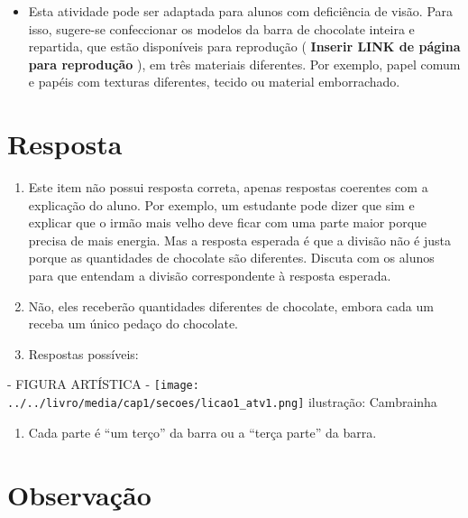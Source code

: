 \documentclass{book}
\begin{document}
\begin{itemize} %
    \item       Esta atividade pode ser adaptada para alunos com deficiência de visão. Para isso, sugere-se confeccionar os modelos da barra de chocolate  inteira e repartida, que estão disponíveis para reprodução (      {\bf Inserir LINK de página para reprodução}      ), em três materiais diferentes. Por exemplo, papel comum e papéis com texturas diferentes, tecido ou material emborrachado.
\end{itemize} %






\section{Resposta}
\begin{enumerate} [\quad a)] %
    \item       Este item não possui resposta correta, apenas respostas coerentes com a explicação do aluno. Por exemplo, um estudante pode dizer que sim e explicar que o irmão mais velho deve ficar com uma parte maior porque precisa de mais energia. Mas a resposta esperada é que a divisão não é justa porque as quantidades de chocolate são diferentes. Discuta com os alunos para que entendam a divisão correspondente à resposta esperada.
    \item       Não, eles receberão quantidades diferentes de chocolate, embora cada um receba um único pedaço do chocolate.
    \item       Respostas possíveis:
\end{enumerate} %
  \begin{imagem*}[breakable]{}{}      - FIGURA ARTÍSTICA -    \mbox{} \newline              \texttt{[image: ../../livro/media/cap1/secoes/licao1\_atv1.png]}    \mbox{} \newline      ilustração: Cambrainha   \end{imagem*}
\begin{enumerate} [\quad a)] %
    \item       Cada parte é       ``um terço''       da barra ou a       ``terça parte''       da barra.
\end{enumerate} %




\section{Observação}
\end{document}
